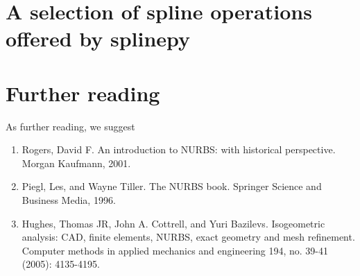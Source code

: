 \documentclass[11pt,a4paper]{article}
\begin{document}
\section{A selection of spline operations offered by splinepy}

\section{Further reading}

As further reading, we suggest

\begin{enumerate}
    \item Rogers, David F. An introduction to NURBS: with historical perspective. Morgan Kaufmann, 2001.
    \item Piegl, Les, and Wayne Tiller. The NURBS book. Springer Science and Business Media, 1996.
    \item Hughes, Thomas JR, John A. Cottrell, and Yuri Bazilevs. Isogeometric analysis: CAD, finite elements, NURBS, exact geometry and mesh refinement. Computer methods in applied mechanics and engineering 194, no. 39-41 (2005): 4135-4195.
\end{enumerate}
\end{document}
